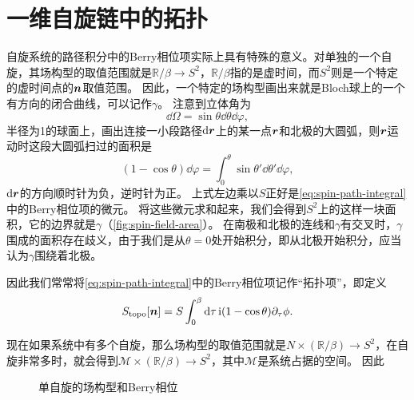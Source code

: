 \chapter{一维自旋链中的拓扑}



自旋系统的路径积分中的Berry相位项实际上具有特殊的意义。对单独的一个自旋，其场构型的取值范围就是$\mathbb{R} / \beta \rightarrow S^2$，$\mathbb{R} / \beta$指的是虚时间，而$S^2$则是一个特定的虚时间点的$\vb*{n}$取值范围。
因此，一个特定的场构型画出来就是Bloch球上的一个有方向的闭合曲线，可以记作$\gamma$。
注意到立体角为
\[
    \dd{\Omega} = \sin \theta \dd{\theta} \dd{\varphi},
\]
半径为1的球面上，画出连接一小段路径$\dd{\vb*{r}}$上的某一点$\vb*{r}$和北极的大圆弧，则$\vb*{r}$运动时这段大圆弧扫过的面积是
\[
    (1 - \cos \theta) \dd{\varphi} = \int_0^\theta \sin \theta' \dd{\theta'} \dd{\varphi},
\]
$\dd{\vb*{r}}$的方向顺时针为负，逆时针为正。
上式左边乘以$S$正好是\eqref{eq:spin-path-integral}中的Berry相位项的微元。
将这些微元求和起来，我们会得到$S^2$上的这样一块面积，它的边界就是$\gamma$（\autoref{fig:spin-field-area}）。
在南极和北极的连线和$\gamma$有交叉时，$\gamma$围成的面积存在歧义，由于我们是从$\theta=0$处开始积分，即从北极开始积分，应当认为$\gamma$围绕着北极。



因此我们常常将\eqref{eq:spin-path-integral}中的Berry相位项记作“拓扑项”，即定义
\begin{equation}
    S_\text{topo}[\vb*{n}] = S \int_0^\beta \dd{\tau} \mathrm{i} (1 - \cos \theta) \partial_\tau \phi.
\end{equation}

现在如果系统中有多个自旋，那么场构型的取值范围就是$N \times (\mathbb{R} / \beta) \to S^2$，在自旋非常多时，就会得到$\mathcal{M} \times (\mathbb{R} / \beta) \to S^2$，其中$\mathcal{M}$是系统占据的空间。
因此

\begin{figure}
    \centering
    \caption{单自旋的场构型和Berry相位}
\end{figure}

